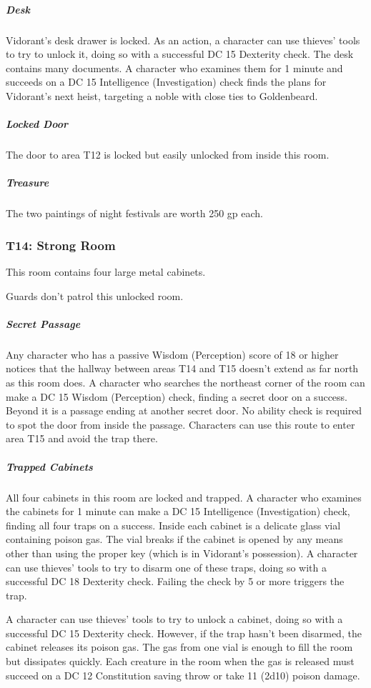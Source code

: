 \documentclass[10pt,a4paper,twoside,bg=print,twocolumn,openany,nodeprecatedcode]{dndbook}
\begin{document}
\subparagraph{Desk}
Vidorant's desk drawer is locked. As an action, a character can use thieves' tools to try to unlock it, doing so with a successful DC 15 Dexterity check. The desk contains many documents. A character who examines them for 1 minute and succeeds on a DC 15 Intelligence (Investigation) check finds the plans for Vidorant's next heist, targeting a noble with close ties to Goldenbeard.

\subparagraph{Locked Door}
The door to area T12 is locked but easily unlocked from inside this room.

\subparagraph{Treasure}
The two paintings of night festivals are worth 250 gp each.

\subsubsection{T14: Strong Room}
\begin{DndReadAloud}{}
This room contains four large metal cabinets.

\end{DndReadAloud}

Guards don't patrol this unlocked room.

\subparagraph{Secret Passage}
Any character who has a passive Wisdom (Perception) score of 18 or higher notices that the hallway between areas T14 and T15 doesn't extend as far north as this room does. A character who searches the northeast corner of the room can make a DC 15 Wisdom (Perception) check, finding a secret door on a success. Beyond it is a passage ending at another secret door. No ability check is required to spot the door from inside the passage. Characters can use this route to enter area T15 and avoid the trap there.

\subparagraph{Trapped Cabinets}
All four cabinets in this room are locked and trapped. A character who examines the cabinets for 1 minute can make a DC 15 Intelligence (Investigation) check, finding all four traps on a success. Inside each cabinet is a delicate glass vial containing poison gas. The vial breaks if the cabinet is opened by any means other than using the proper key (which is in Vidorant's possession). A character can use thieves' tools to try to disarm one of these traps, doing so with a successful DC 18 Dexterity check. Failing the check by 5 or more triggers the trap.

A character can use thieves' tools to try to unlock a cabinet, doing so with a successful DC 15 Dexterity check. However, if the trap hasn't been disarmed, the cabinet releases its poison gas. The gas from one vial is enough to fill the room but dissipates quickly. Each creature in the room when the gas is released must succeed on a DC 12 Constitution saving throw or take 11 (2d10) poison damage.
\end{document}
